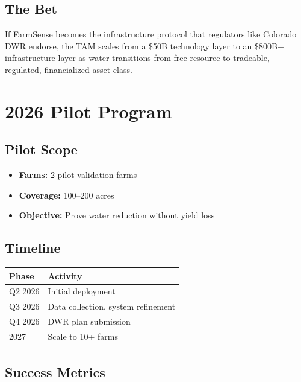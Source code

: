 \documentclass[10pt]{article}
\begin{document}
\subsection{The Bet}

If FarmSense becomes the infrastructure protocol that regulators like Colorado DWR endorse, the TAM scales from a \$50B technology layer to an \$800B+ infrastructure layer as water transitions from free resource to tradeable, regulated, financialized asset class.

\newpage

\section{2026 Pilot Program}

\subsection{Pilot Scope}

\begin{itemize}
    \item \textbf{Farms:} 2 pilot validation farms
    \item \textbf{Coverage:} 100–200 acres
    \item \textbf{Objective:} Prove water reduction without yield loss
\end{itemize}

\subsection{Timeline}

\begin{table}[h]
\centering
\begin{tabular}{@{}ll@{}}
\toprule
\textbf{Phase} & \textbf{Activity} \\
\midrule
Q2 2026 & Initial deployment \\
Q3 2026 & Data collection, system refinement \\
Q4 2026 & DWR plan submission \\
2027 & Scale to 10+ farms \\
\bottomrule
\end{tabular}
\end{table}

\subsection{Success Metrics}
\end{document}
